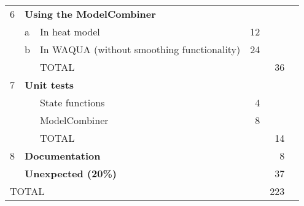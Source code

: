 \documentclass[a4paper,12pt]{article}
\begin{document}
\begin{tabular}{|lllrr|r}
\hline\hline
6 & \multicolumn{2}{l}{\bf Using the ModelCombiner} &   &    \\
  & a & In heat model                          &12 &    \\
  & b & In WAQUA (without smoothing functionality)  &24 &    \\
  &   & TOTAL                                  &   & 36 \\
\hline\hline
7 & \multicolumn{2}{l}{\bf Unit tests}  &   &    \\
  &   & State functions                        & 4 &    \\
  &   & ModelCombiner                          & 8 &    \\
  &   & TOTAL                                  &   & 14 \\
\hline\hline
8 & \multicolumn{2}{l}{\bf Documentation}      &   &  8 \\
\hline\hline
  & \multicolumn{2}{l}{\bf Unexpected (20\%)}  &   &  37 \\
\hline
\multicolumn{4}{l}{TOTAL}&\multicolumn{1}{r}{223}
\end{tabular}
\end{document}
